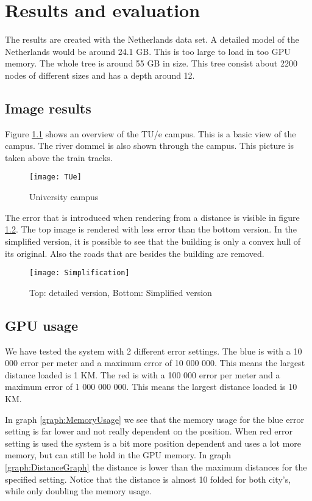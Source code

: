 \chapter{Results and evaluation}
\label{chap:ResultsAndEvaluation}
The results are created with the Netherlands data set. A detailed model of the Netherlands would be around 24.1 GB. This is too large to load in too GPU memory. The whole tree is around 55 GB in size. This tree consist about 2200 nodes of different sizes and has a depth around 12.

\section{Image results}
\label{sec:ImageResults}
Figure \ref{fig:UniversityCampus} shows an overview of the TU/e campus. This is a basic view of the campus. The river dommel is also shown through the campus. This picture is taken above the train tracks.

\begin{figure}[htb!]
\centering
\texttt{[image: TUe]}
\caption{University campus}
\label{fig:UniversityCampus}
\end{figure}

The error that is introduced when rendering from a distance is visible in figure \ref{fig:Simplification}. The top image is rendered with less error than the bottom version. In the simplified version, it is possible to see that the building is only a convex hull of its original. Also the roads that are besides the building are removed.

\begin{figure}[htb!]
\centering
\texttt{[image: Simplification]}
\caption{Top: detailed version, Bottom: Simplified version}
\label{fig:Simplification}
\end{figure}

\section{GPU usage}
\label{sec:GPUUsage}
We have tested the system with 2 different error settings. The blue is with a 10 000 error per meter and a maximum error of 10 000 000. This means the largest distance loaded is 1 KM. The red is with a 100 000 error per meter and a maximum error of 1 000 000 000. This means the largest distance loaded is 10 KM.

In graph \ref{graph:MemoryUsage} we see that the memory usage for the blue error setting is far lower and not really dependent on the position. When red error setting is used the system is a bit more position dependent and uses a lot more memory, but can still be hold in the GPU memory. In graph \ref{graph:DistanceGraph} the distance is lower than the maximum distances for the specified setting. Notice that the distance is almost 10 folded for both city's, while only doubling the memory usage.

